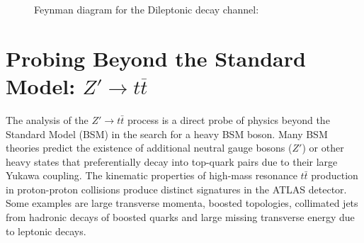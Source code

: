 \begin{itemize}
\begin{figure}[H]
    \centering
\caption{Feynman diagram for the Dileptonic decay channel:}
\end{figure}

\end{itemize}


\section{Probing Beyond the Standard Model: \texorpdfstring{$Z' \rightarrow t\overline{t}$}{}}

The analysis of the \( Z' \rightarrow t\bar{t} \) process is a direct probe of physics beyond the Standard Model (BSM) in the search for a heavy BSM boson. Many BSM theories predict the existence of additional neutral gauge bosons (\( Z' \)) or other heavy states that preferentially decay into top-quark pairs due to their large Yukawa coupling. The kinematic properties of high-mass resonance $t\bar{t}$ production in proton-proton collisions produce distinct signatures in the ATLAS detector. Some examples are large transverse momenta, boosted topologies, collimated jets from hadronic decays of boosted quarks and large missing transverse energy due to leptonic decays.\\

